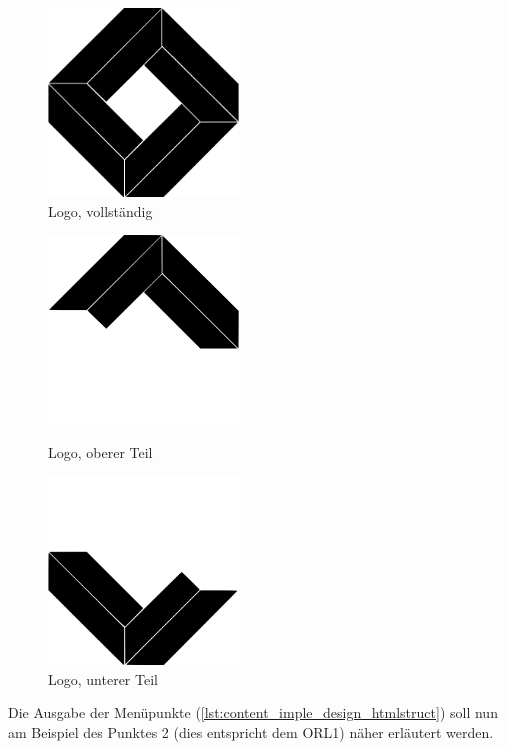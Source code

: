 \begin{figure}[H]
	\centering
	\begin{minipage}{7cm}
		\centering
		\includegraphics[keepaspectratio=true, height=5cm]{images/logo-black.png}
		\caption{Logo, vollständig}
		\label{fig:content_impl_design_logo}
	\end{minipage}
\end{figure}

\begin{figure}[H]
	\centering
	\begin{minipage}{7cm}
		\centering
		\includegraphics[keepaspectratio=true, height=5cm]{images/logo-up.png}
		\caption{Logo, oberer Teil}
		\label{fig:content_impl_design_logo-up}
	\end{minipage}
	\hspace{1cm}
	\begin{minipage}{7cm}
		\centering
		\includegraphics[keepaspectratio=true, height=5cm]{images/logo-down.png}
		\caption{Logo, unterer Teil}
		\label{fig:content_impl_design_logo-down}
	\end{minipage}
\end{figure}
Die Ausgabe der Menüpunkte (\autoref{lst:content_imple_design_htmlstruct}) soll nun am Beispiel des Punktes 2 (dies entspricht dem ORL1) näher erläutert werden.\\

